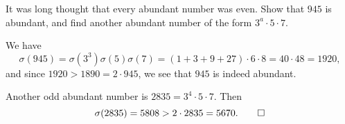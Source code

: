  It was long thought that every abundant number was
even. Show that $945$ is abundant, and find another abundant number of
the form $3^a\cdot5\cdot7$.
\begin{solution}
  We have
  \begin{equation*}
    \sigma(945)
    = \sigma(3^3)\sigma(5)\sigma(7)
    = (1 + 3 + 9 + 27)\cdot6\cdot8
    = 40\cdot48
    = 1920,
  \end{equation*}
  and since $1920 > 1890 = 2\cdot945$, we see that $945$ is indeed
  abundant.

  Another odd abundant number is $2835 = 3^4\cdot5\cdot7$. Then
  \begin{equation*}
    \sigma(2835) = 5808 > 2\cdot2835 = 5670. \qedhere
  \end{equation*}
\end{solution}
